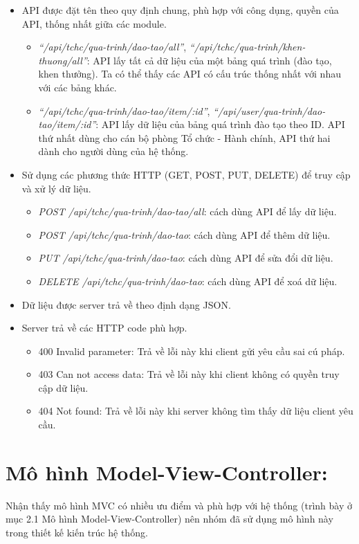 \begin{itemize}
    \item API được đặt tên theo quy định chung, phù hợp với công dụng, quyền của API, thống nhất giữa các module.
    \begin{itemize}
        \item \textit{``/api/tchc/qua-trinh/dao-tao/all''}, \textit{``/api/tchc/qua-trinh/khen-thuong/all''}: API lấy tất cả dữ liệu của một bảng quá trình (đào tạo, khen thưởng). Ta có thể thấy các API có cấu trúc thống nhất với nhau với các bảng khác.
        \item \textit{``/api/tchc/qua-trinh/dao-tao/item/:id''}, \textit{``/api/user/qua-trinh/dao-tao/item/:id''}: API lấy dữ liệu của bảng quá trình đào tạo theo ID. API thứ nhất dùng cho cán bộ phòng Tổ chức - Hành chính, API thứ hai dành cho người dùng của hệ thống.
    \end{itemize}
    \item Sử dụng các phương thức HTTP (GET, POST, PUT, DELETE) để truy cập và xử lý dữ liệu.
    \begin{itemize}
        \item  \textit{POST /api/tchc/qua-trinh/dao-tao/all}: cách dùng API để lấy dữ liệu.
        \item  \textit{POST /api/tchc/qua-trinh/dao-tao}: cách dùng API để thêm dữ liệu.
        \item  \textit{PUT /api/tchc/qua-trinh/dao-tao}: cách dùng API để sửa đổi dữ liệu.
        \item  \textit{DELETE /api/tchc/qua-trinh/dao-tao}: cách dùng API để xoá dữ liệu.
    \end{itemize}
    \item Dữ liệu được server trả về theo định dạng JSON.
    \item Server trả về các HTTP code phù hợp.
    \begin{itemize}
        \item  400 Invalid parameter: Trả về lỗi này khi client gửi yêu cầu sai cú pháp.
        \item  403 Can not access data: Trả về lỗi này khi client không có quyền truy cập dữ liệu.
        \item  404 Not found: Trả về lỗi này khi server không tìm thấy dữ liệu client yêu cầu.
    \end{itemize}
\end{itemize}
\section{Mô hình Model-View-Controller:}
Nhận thấy mô hình MVC có nhiều ưu điểm và phù hợp với hệ thống (trình bày ở mục 2.1 Mô hình Model-View-Controller) nên nhóm đã sử dụng mô hình này trong thiết kế kiến trúc hệ thống.

